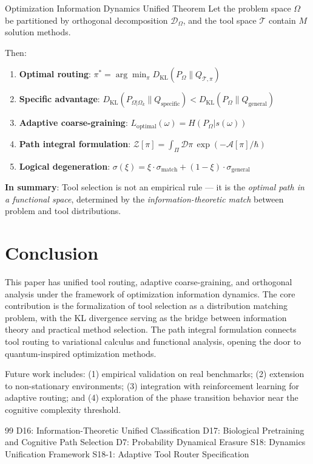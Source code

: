 \documentclass[12pt, a4paper]{article}
\newcommand{\calD}{\mathcal{D}}
\newcommand{\KL}{D_{\mathrm{KL}}}
\newcommand{\argmin}{\arg\min}
\newcommand{\hbarF}{\hbar}
\begin{document}
\begin{thmbox}{Optimization Information Dynamics Unified Theorem}
Let the problem space $\Omega$ be partitioned by orthogonal decomposition $\calD_{\Omega}$, and the tool space $\mathcal{T}$ contain $M$ solution methods.

Then:
\begin{enumerate}
\item \textbf{Optimal routing}: $\pi^* = \argmin_{\pi} \KL(P_{\Omega} \| Q_{\mathcal{T},\pi})$
\item \textbf{Specific advantage}: $\KL(P_{\Omega|\Omega_k} \| Q_{\text{specific}}) < \KL(P_{\Omega} \| Q_{\text{general}})$
\item \textbf{Adaptive coarse-graining}: $L_{\text{optimal}}(\omega) = H(P_{\Omega} | s(\omega))$
\item \textbf{Path integral formulation}: $\mathcal{Z}[\pi] = \int_{\Pi} \mathcal{D}\pi \, \exp(-\mathcal{A}[\pi]/\hbarF)$
\item \textbf{Logical degeneration}: $\sigma(\xi) = \xi \cdot \sigma_{\text{match}} + (1-\xi) \cdot \sigma_{\text{general}}$
\end{enumerate}

\textbf{In summary}: Tool selection is not an empirical rule --- it is the \emph{optimal path in a functional space}, determined by the \emph{information-theoretic match} between problem and tool distributions.
\end{thmbox}

\section{Conclusion}

This paper has unified tool routing, adaptive coarse-graining, and orthogonal analysis under the framework of optimization information dynamics. The core contribution is the formalization of tool selection as a distribution matching problem, with the KL divergence serving as the bridge between information theory and practical method selection. The path integral formulation connects tool routing to variational calculus and functional analysis, opening the door to quantum-inspired optimization methods.

Future work includes: (1) empirical validation on real benchmarks; (2) extension to non-stationary environments; (3) integration with reinforcement learning for adaptive routing; and (4) exploration of the phase transition behavior near the cognitive complexity threshold.

\begin{thebibliography}{99}
 D16: Information-Theoretic Unified Classification
 D17: Biological Pretraining and Cognitive Path Selection
 D7: Probability Dynamical Erasure
 S18: Dynamics Unification Framework
 S18-1: Adaptive Tool Router Specification
\end{thebibliography}
\end{document}
